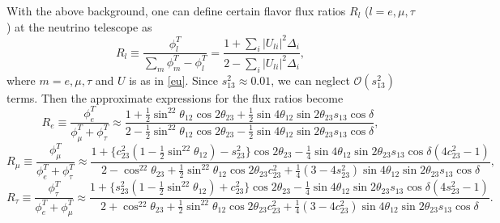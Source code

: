 \documentclass[11pt]{article}
\begin{document}
With the above background, one can define certain flavor flux ratios $R_l$ ($l=e,\mu,\tau$) at the neutrino telescope as 
\begin{equation} R_l\equiv\frac{\phi_l^T}{\sum\limits_{m}\phi_m^T-\phi_l^T}=\frac{1+\sum\limits_{i}|U_{l i}|^2\Delta_i}{2-\sum\limits_{i}|U_{l i}|^2\Delta_i},
\end{equation} where $m=e,\mu,\tau$ and $U$ is as in \eqref{eu}. Since $s_{13}^2\approx 0.01$, we can neglect $\mathcal{O}(s^2_{13})$ terms. Then the approximate expressions for the flux ratios become \begin{equation}
R_e\equiv\frac{\phi_e^T}{\phi^T_\mu+\phi^T_\tau}\approx\frac{1+\frac{1}{2}\sin^22\theta_{12}\cos2\theta_{23}+\frac{1}{2}\sin4\theta_{12}\sin2\theta_{23}s_{13}\cos\delta}{2-\frac{1}{2}\sin^22\theta_{12}\cos2\theta_{23}-\frac{1}{2}\sin4\theta_{12}\sin2\theta_{23}s_{13}\cos\delta},\label{a}\end{equation}
\begin{equation}R_\mu\equiv\frac{\phi_\mu^T}{\phi^T_e+\phi^T_\tau}\approx\frac{1+\{c^2_{23}(1-\frac{1}{2}\sin^22\theta_{12})-s^2_{23}\}\cos2\theta_{23}-\frac{1}{4}\sin4\theta_{12}\sin2\theta_{23}s_{13}\cos\delta(4c^2_{23}-1)}{2-\cos^22\theta_{23}+\frac{1}{2}\sin^22\theta_{12}\cos2\theta_{23}c^2_{23}+\frac{1}{4}(3-4s^2_{23})\sin4\theta_{12}\sin2\theta_{23}s_{13}\cos\delta},\label{b}\end{equation}
\begin{equation}R_\tau\equiv\frac{\phi_\tau^T}{\phi^T_e+\phi^T_\mu}\approx
\frac{1+\{s^2_{23}(1-\frac{1}{2}\sin^22\theta_{12})+c^2_{23}\}\cos2\theta_{23}-\frac{1}{4}\sin4\theta_{12}\sin2\theta_{23}s_{13}\cos\delta(4s^2_{23}-1)}{2+\cos^22\theta_{23}+\frac{1}{2}\sin^22\theta_{12}\cos2\theta_{23}c^2_{23}+\frac{1}{4}(3-4c^2_{23})\sin4\theta_{12}\sin2\theta_{23}s_{13}\cos\delta}.\label{c}
\end{equation} 
\noindent
\end{document}
